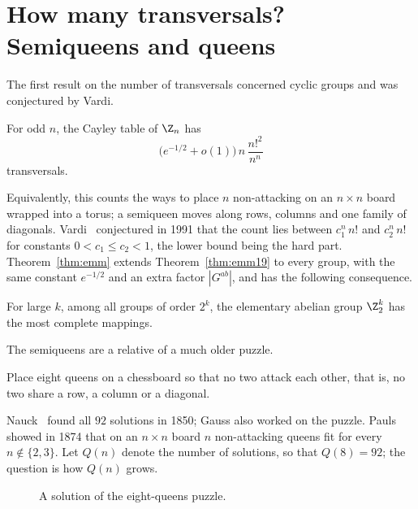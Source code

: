 \section{How many transversals? Semiqueens and queens}\label{sec:counting}


The first result on the number of transversals concerned cyclic groups and was conjectured by Vardi.

\begin{theorem}\label{thm:emm19}
For odd $n$, the Cayley table of $\Z_n$ has
\[
\bigl(e^{-1/2}+o(1)\bigr)\,n\,\frac{n!^2}{n^n}
\]
transversals.
\end{theorem}

Equivalently, this counts the ways to place $n$ non-attacking  on an $n\times n$ board wrapped into a torus; a semiqueen moves along rows, columns and one family of diagonals. Vardi~\cite{var91} conjectured in 1991 that the count lies between $c_1^n\,n!$ and $c_2^n\,n!$ for constants $0<c_1\leq c_2<1$, the lower bound being the hard part. Theorem~\ref{thm:emm} extends Theorem~\ref{thm:emm19} to every group, with the same constant $e^{-1/2}$ and an extra factor $|G^{ab}|$, and has the following consequence.

\begin{corollary}\label{cor:most}
For large $k$, among all groups of order $2^k$, the elementary abelian group $\Z_2^k$ has the most complete mappings.
\end{corollary}


The semiqueens are a relative of a much older puzzle.

\begin{problem}\label{prob:queens}
Place eight queens on a chessboard so that no two attack each other, that is, no two share a row, a column or a diagonal.
\end{problem}

Nauck~\cite{nau1850} found all $92$ solutions in 1850; Gauss also worked on the puzzle. Pauls~\cite{pau1874} showed in 1874 that on an $n\times n$ board $n$ non-attacking queens fit for every $n\notin\{2,3\}$. Let $Q(n)$ denote the number of solutions, so that $Q(8)=92$; the question is how $Q(n)$ grows.

\begin{figure}[ht]
\centering

\caption{A solution of the eight-queens puzzle.}
\label{fig:eight-queens}
\end{figure}


